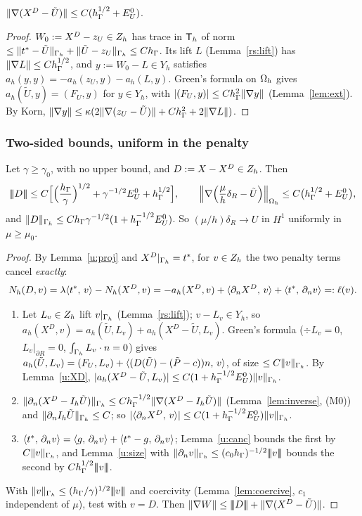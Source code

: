 \begin{lemma}\label{u:XD}
$\lVert \nabla(X^D-\tilde U)\rVert\le C(h_\Gamma^{1/2}+E^0_U)$.
\end{lemma}

\begin{proof}
$W_0:=X^D-z_U\in Z_h$ has trace in $\mathsf T_h$ of norm $\le\lVert t^\ast-\tilde U\rVert_{\Gamma_h}+\lVert \tilde U-z_U\rVert_{\Gamma_h}\le Ch_\Gamma$. Its lift $L$ (Lemma~\ref{rs:lift}) has $\lVert \nabla L\rVert\le Ch_\Gamma^{1/2}$, and $y:=W_0-L\in Y_h$ satisfies $a_h(y,y)=-a_h(z_U,y)-a_h(L,y)$. Green's formula on $\Omega_h$ gives $a_h(\tilde U,y)=(F_U,y)$ for $y\in Y_h$, with $|(F_U,y)|\le Ch_\Gamma^2\lVert \nabla y\rVert$ (Lemma~\ref{lem:ext}). By Korn, $\lVert \nabla y\rVert\le\kappa(2\lVert \nabla(z_U-\tilde U)\rVert+Ch_\Gamma^2+2\lVert \nabla L\rVert)$.
\end{proof}

\subsubsection{Two-sided bounds, uniform in the penalty}

\begin{theorem}\label{u:up}
Let $\gamma\ge\gamma_0$, with no upper bound, and $D:=X-X^D\in Z_h$. Then
\[
|\!|\!|D|\!|\!|\le C\Bigl[\Bigl(\frac{h_\Gamma}\gamma\Bigr)^{1/2}+\gamma^{-1/2}E^0_U+h_\Gamma^{1/2}\Bigr],\qquad
\Bigl\|\nabla\Bigl(\frac\mu h\delta_R-\tilde U\Bigr)\Bigr\|_{\Omega_h}\le C\bigl(h_\Gamma^{1/2}+E^0_U\bigr),
\]
and $\lVert D\rVert_{\Gamma_h}\le Ch_\Gamma\gamma^{-1/2}(1+h_\Gamma^{-1/2}E^0_U)$. So $(\mu/h)\delta_R\to U$ in $H^1$ uniformly in $\mu\ge\mu_0$.
\end{theorem}

\begin{proof}
By Lemma~\ref{u:proj} and $X^D|_{\Gamma_h}=t^\ast$, for $v\in Z_h$ the two penalty terms cancel \emph{exactly}:
\[
N_h(D,v)=\lambda\langle t^\ast,\, v\rangle-N_h(X^D,v)=-a_h(X^D,v)+\langle \partial_n X^D,\, v\rangle+\langle t^\ast,\, \partial_n v\rangle=:\ell(v).
\]
\begin{enumerate}
\item Let $L_v\in Z_h$ lift $v|_{\Gamma_h}$ (Lemma~\ref{rs:lift}); $v-L_v\in Y_h$, so $a_h(X^D,v)=a_h(\tilde U,L_v)+a_h(X^D-\tilde U,L_v)$. Green's formula ($\div L_v=0$, $L_v|_{\partial R}=0$, $\int_{\Gamma_h}L_v\cdot n=0$) gives $a_h(\tilde U,L_v)=(F_U,L_v)+\langle (D(\tilde U)-(\tilde P-c))n,\, v\rangle$, of size $\le C\lVert v\rVert_{\Gamma_h}$. By Lemma~\ref{u:XD}, $|a_h(X^D-\tilde U,L_v)|\le C(1+h_\Gamma^{-1/2}E^0_U)\lVert v\rVert_{\Gamma_h}$.
\item $\lVert \partial_n(X^D-I_h\tilde U)\rVert_{\Gamma_h}\le Ch_\Gamma^{-1/2}\lVert \nabla(X^D-I_h\tilde U)\rVert$ (Lemma~\ref{lem:inverse}, (M0)) and $\lVert \partial_n I_h\tilde U\rVert_{\Gamma_h}\le C$; so $|\langle \partial_n X^D,\, v\rangle|\le C(1+h_\Gamma^{-1/2}E^0_U)\lVert v\rVert_{\Gamma_h}$.
\item $\langle t^\ast,\, \partial_n v\rangle=\langle g,\, \partial_n v\rangle+\langle t^\ast-g,\, \partial_n v\rangle$; Lemma~\ref{u:canc} bounds the first by $C\lVert v\rVert_{\Gamma_h}$, and Lemma~\ref{u:size} with $\lVert \partial_n v\rVert_{\Gamma_h}\le(c_0h_\Gamma)^{-1/2}|\!|\!|v|\!|\!|$ bounds the second by $Ch_\Gamma^{1/2}|\!|\!|v|\!|\!|$.
\end{enumerate}
With $\lVert v\rVert_{\Gamma_h}\le(h_\Gamma/\gamma)^{1/2}|\!|\!|v|\!|\!|$ and coercivity (Lemma~\ref{lem:coercive}, $c_1$ independent of $\mu$), test with $v=D$. Then $\lVert \nabla W\rVert\le|\!|\!|D|\!|\!|+\lVert \nabla(X^D-\tilde U)\rVert$.
\end{proof}

